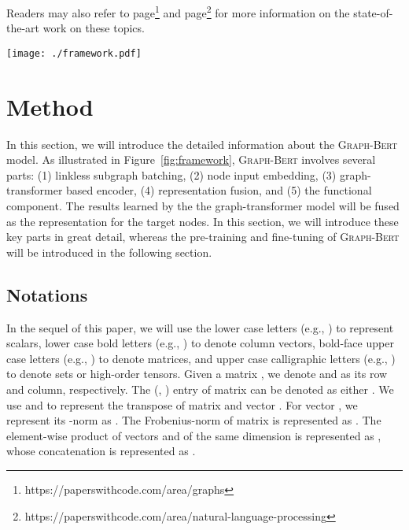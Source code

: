\documentclass{article}
\newcommand{\our}{\textsc{Graph-Bert}}
\begin{document}
\vspace{5pt}

Readers may also refer to page\footnote{https://paperswithcode.com/area/graphs} and page\footnote{https://paperswithcode.com/area/natural-language-processing} for more information on the state-of-the-art work on these topics.
\begin{figure*}
    \centering
    \begin{minipage}{.95\textwidth}
    	\texttt{[image: ./framework.pdf]}
     \end{minipage}\caption{Architecture of the {\our} Model. (Part 1: linkless subgraph batching; Part 2: node input vector embeddings; Part 3: graph transformer based encoder; Part 4: representation fusion; Part 5: functional component. Depending on the target application task, the function component will generate different output. In the sampled subgraphs, it covers both the target node and the surrounding context nodes.)}
    	\label{fig:framework}
\end{figure*}


\section{Method}\label{sec:method}

In this section, we will introduce the detailed information about the {\our} model. As illustrated in Figure~\ref{fig:framework}, {\our} involves several parts: (1) linkless subgraph batching, (2) node input embedding, (3) graph-transformer based encoder, (4) representation fusion, and (5) the functional component. The results learned by the the graph-transformer model will be fused as the representation for the target nodes. In this section, we will introduce these key parts in great detail, whereas the pre-training and fine-tuning of {\our} will be introduced in the following section.


\subsection{Notations}

In the sequel of this paper, we will use the lower case letters (e.g., ) to represent scalars, lower case bold letters (e.g., ) to denote column vectors, bold-face upper case letters (e.g., ) to denote matrices, and upper case calligraphic letters (e.g., ) to denote sets or high-order tensors. Given a matrix , we denote  and  as its  row and  column, respectively. The (, ) entry of matrix  can be denoted as either . We use  and  to represent the transpose of matrix  and vector . For vector , we represent its -norm as . The Frobenius-norm of matrix  is represented as . The element-wise product of vectors  and  of the same dimension is represented as , whose concatenation is represented as .
\end{document}
